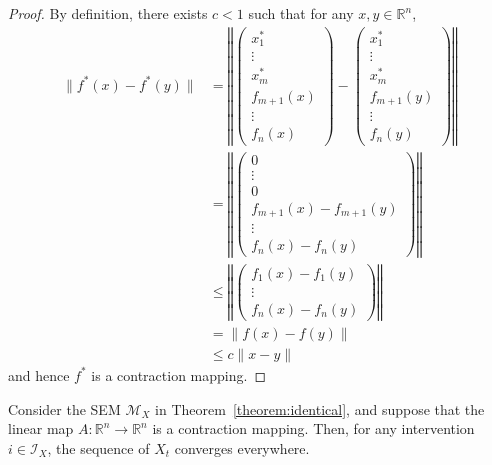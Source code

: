 \begin{proof}
By definition, there exists $c < 1$ such that for any $x,y\in \mathbb{R}^n$,
\begin{align*}
\| f^*(x) - f^*(y) \| &=
\left\Vert
\begin{pmatrix}x^*_1\\ \vdots \\ x^*_m \\ f_{m+1}(x) \\ \vdots \\ f_n(x) \end{pmatrix} - \begin{pmatrix}x^*_1\\ \vdots \\ x^*_m \\ f_{m+1}(y) \\ \vdots \\ f_n(y) \end{pmatrix} \right\Vert\\
&=
\left\Vert
\begin{pmatrix} 0 \\ \vdots \\ 0 \\ f_{m+1}(x) - f_{m+1}(y) \\ \vdots \\ f_{n}(x) - f_n(y) \end{pmatrix} \right\Vert \\
&\leq \left\Vert
\begin{pmatrix} f_{1}(x) - f_1(y)  \\ \vdots \\ f_{n}(x) - f_n(y) \end{pmatrix} \right\Vert \\
& = \| f(x)-f(y) \|    \\
&\leq c \| x - y \|
\end{align*}
and hence $f^*$ is a contraction mapping.
\end{proof}

\medskip


\begin{lemma}\label{lemma:contraction_convergence}
Consider the SEM $\mathcal{M}_X$ in Theorem~\ref{theorem:identical}, and suppose that the linear map $A:\mathbb{R}^n \to \mathbb{R}^n$ is a contraction mapping.
Then, for any intervention $i\in\mathcal{I}_X$, the sequence of $X_t$ converges everywhere.
\end{lemma}

\medskip

